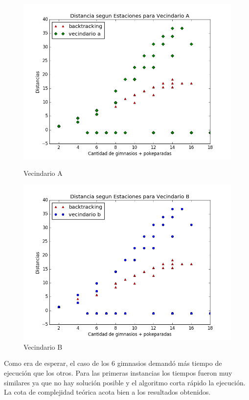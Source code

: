 \begin{figure}[H]
  \includegraphics[width=\linewidth]{imagenes/Ej3/Exp2Ej3A.png}
  \caption{Vecindario A}
\endminipage\hfill
{}%
  \includegraphics[width=\linewidth]{imagenes/Ej3/Exp2Ej3B.png}
  \caption{Vecindario B}
\endminipage
\end{figure}

\blindtext

Como era de esperar, el caso de los 6 gimnasios demandó más tiempo de ejecución que los otros. Para las primeras instancias los tiempos fueron muy similares ya que no hay solución posible y el algoritmo corta rápido la ejecución. La cota de complejidad teórica acota bien a los resultados obtenidos.


